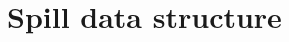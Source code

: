 \documentclass[a4paper, 10pt] {report}
\begin{document}
\chapter{Spill data structure}
 
\end{document}
